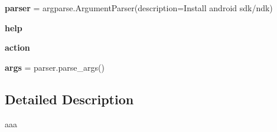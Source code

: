 \begin{DoxyCompactItemize}
{\bfseries parser} = argparse.\+Argument\+Parser(description=\textquotesingle{}Install android sdk/ndk\textquotesingle{})
\item 
\mbox{\label{namespacesetup__android_a75ed5a7089afcc95de241b074e5cf847}} 
{\bfseries help}
\item 
\mbox{\label{namespacesetup__android_abb8a49bc65c02ef13f928044a1061c95}} 
{\bfseries action}
\item 
\mbox{\label{namespacesetup__android_a82b552faa26932cb4533f04501fe4e46}} 
{\bfseries args} = parser.\+parse\+\_\+args()
\end{DoxyCompactItemize}


\subsection{Detailed Description}
\begin{DoxyVerb}aaa
\end{DoxyVerb}
 
